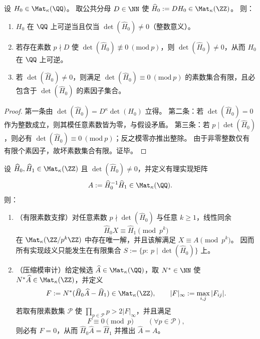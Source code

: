 

\begin{proposition}\label{prop:xi-hankel-fullrank-one-prime-audit}
设 \(H_0\in \Mat_\kappa(\QQ)\)。
取公共分母 \(D\in\NN\) 使 \(\widehat H_0:=DH_0\in \Mat_\kappa(\ZZ)\)。
则：
\begin{enumerate}
  \item \(H_0\) 在 \(\QQ\) 上可逆当且仅当 \(\det(\widehat H_0)\neq 0\)（整数意义）。
  \item 若存在素数 \(p\nmid D\) 使 \(\det(\widehat H_0)\not\equiv 0\ (\mathrm{mod}\ p)\)，则 \(\det(\widehat H_0)\neq 0\)，从而 \(H_0\) 在 \(\QQ\) 上可逆。
  \item 若 \(\det(\widehat H_0)\neq 0\)，则满足 \(\det(\widehat H_0)\equiv 0\ (\mathrm{mod}\ p)\) 的素数集合有限，且必包含于 \(\det(\widehat H_0)\) 的素因子集合。
\end{enumerate}
\end{proposition}
\begin{proof}
第一条由 \(\det(\widehat H_0)=D^\kappa\det(H_0)\) 立得。
第二条：若 \(\det(\widehat H_0)=0\) 作为整数成立，则其模任意素数皆为零，与假设矛盾。
第三条：若 \(p\mid \det(\widehat H_0)\)，则必有 \(\det(\widehat H_0)\equiv 0\ (\mathrm{mod}\ p)\)；反之模零亦推出整除。
由于非零整数仅有有限个素因子，故坏素数集合有限。证毕。
\end{proof}

\begin{proposition}\label{prop:xi-hankel-linear-realization-finite-prime-support-mod-audit}
设 \(\widehat H_0,\widehat H_1\in\Mat_{\kappa}(\ZZ)\) 且 \(\det(\widehat H_0)\neq 0\)，并定义有理实现矩阵
\[
A:=\widehat H_0^{-1}\widehat H_1\in\Mat_{\kappa}(\QQ).
\]
则：
\begin{enumerate}
  \item \textnormal{（有限素数支撑）}对任意素数 \(p\nmid\det(\widehat H_0)\) 与任意 \(k\ge 1\)，线性同余
  \[
  \widehat H_0X\equiv \widehat H_1\pmod{p^k}
  \]
  在 \(\Mat_{\kappa}(\ZZ/p^k\ZZ)\) 中存在唯一解，并且该解满足 \(X\equiv A\pmod{p^k}\)。
  因而所有实现歧义只能发生在有限集合 \(S:=\{p:\ p\mid \det(\widehat H_0)\}\) 上。
  \item \textnormal{（压缩模审计）}给定候选 \(\widehat A\in\Mat_{\kappa}(\QQ)\)，取 \(N^\ast\in\NN\) 使 \(N^\ast\widehat A\in\Mat_{\kappa}(\ZZ)\)，并定义
  \[
  F:=N^\ast(\widehat H_0\widehat A-\widehat H_1)\in\Mat_{\kappa}(\ZZ),
  \qquad
  |F|_\infty:=\max_{i,j}|F_{ij}|.
  \]
  若取有限素数集 \(\mathcal P\) 使 \(\prod_{p\in\mathcal P}p>2|F|_\infty\)，并且满足
  \[
  F\equiv 0\pmod p\qquad(\forall p\in\mathcal P),
  \]
  则必有 \(F=0\)，从而 \(\widehat H_0\widehat A=\widehat H_1\) 并推出 \(\widehat A=A\)。
\end{enumerate}
\end{proposition}

